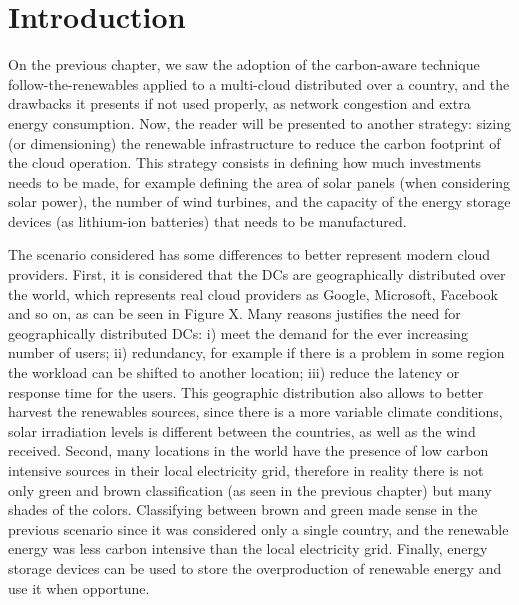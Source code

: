 \section{Introduction}


On the previous chapter, we saw the adoption of the carbon-aware technique follow-the-renewables applied to a multi-cloud distributed over a country, and the drawbacks it presents if not used properly, as network congestion and extra energy consumption. Now, the reader will be presented to another strategy: sizing (or dimensioning) the renewable infrastructure to reduce the carbon footprint of the cloud operation. This strategy consists in defining how much investments needs to be made, for example defining the area of solar panels (when considering solar power), the number of wind turbines, and the capacity of the energy storage devices (as lithium-ion batteries) that needs to be manufactured. 

The scenario considered has some differences to better represent modern cloud providers. First, it is considered that the DCs are geographically distributed over the world, which represents real cloud providers as Google, Microsoft, Facebook and so on, as can be seen in Figure X. Many reasons justifies the need for geographically distributed DCs: i) meet the demand for the ever increasing number of users; ii) redundancy, for example if there is a problem in some region the workload can be shifted to another location; iii) reduce the latency or response time for the users. This geographic distribution also allows to better harvest the renewables sources, since there is a more variable climate conditions, solar irradiation levels is different between the countries, as well as the wind received. Second, many locations in the world have the presence of low carbon intensive sources in their local electricity grid, therefore in reality there is not only green and brown classification (as seen in the previous chapter) but many shades of the colors. Classifying between brown and green made sense in the previous scenario since it was considered only a single country, and the renewable energy was less carbon intensive than the local electricity grid. Finally, energy storage devices can be used to store the overproduction of renewable energy and use it when opportune.

